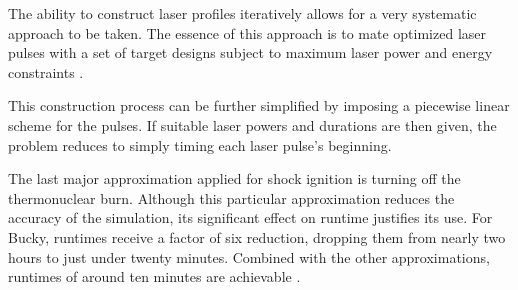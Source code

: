 The ability to construct laser profiles iteratively allows for a very systematic approach to be taken.  The essence of this approach is to mate optimized laser pulses with a set of target designs subject to maximum laser power and energy constraints \citep{perkinsPaper}.  

This construction process can be further simplified by imposing a piecewise linear scheme for the pulses.  If suitable laser powers and durations are then given, the problem reduces to simply timing each laser pulse's beginning.   

The last major approximation applied for shock ignition is turning off the thermonuclear burn.  Although this particular approximation reduces the accuracy of the simulation, its significant effect on runtime justifies its use.  For Bucky, runtimes receive a factor of six reduction, dropping them from nearly two hours to just under twenty minutes.  Combined with the other approximations, runtimes of around ten minutes are achievable \citep{terryThesis}.

